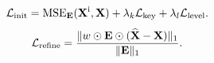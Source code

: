 \begin{equation}
 \mathcal L_{\rm init}=\operatorname{MSE}_{\mathbf{E}}(\mathbf{X}^{\rm i},\mathbf{X})+\lambda_k\mathcal L_{\rm key}+\lambda_l\mathcal L_{\rm level}.
 \label{eq:initial_objective}
\end{equation}
\begin{equation}
 \mathcal L_{\rm refine}=\frac{\|w\odot\mathbf{E}\odot(\widehat{\mathbf{X}}-\mathbf{X})\|_1}{\|\mathbf{E}\|_1}.
 \label{eq:refinement_objective}
\end{equation}
